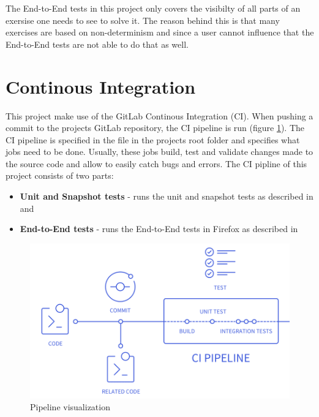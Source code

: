The End-to-End tests in this project only covers the visibilty of all parts of an exersise one needs to see to solve it. The reason behind this is that many exercises are based on non-determinism and since a user cannot influence that the End-to-End tests are not able to do that as well.

\section{Continous Integration}
\label{section:CI}

This project make use of the GitLab Continous Integration (CI). When pushing a commit to the projects GitLab repository, the CI pipeline is run (figure \ref{fig:pipeline}). The CI pipeline is specified in the  file in the projects root folder and specifies what jobs need to be done. Usually, these jobs build, test and validate changes made to the source code and allow to easily catch bugs and errors.
The CI pipline of this project consists of two parts:

\begin{itemize}
    \item \textbf{Unit and Snapshot tests} - runs the unit and snapshot tests as described in  and 
    \item \textbf{End-to-End tests} - runs the End-to-End tests in Firefox as described in 
\end{itemize}

\begin{figure} 
    \centering
    \includegraphics[width=0.6 \columnwidth]{figures/pipeline.png}
    \caption{Pipeline visualization \cite{CIPipeline}} 
    \label{fig:pipeline} 
\end{figure}